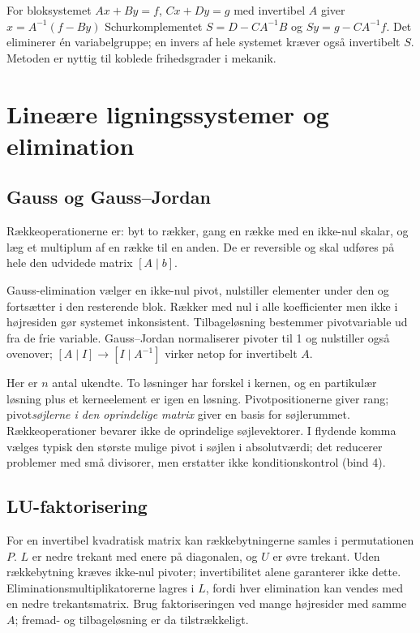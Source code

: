 For bloksystemet $Ax+By=f$, $Cx+Dy=g$ med invertibel $A$ giver
$x=A^{-1}(f-By)$ Schurkomplementet
$S=D-CA^{-1}B$ og $Sy=g-CA^{-1}f$. Det eliminerer én variabelgruppe;
en invers af hele systemet kræver også invertibelt $S$.
Metoden er nyttig til koblede frihedsgrader i mekanik.

\section{Lineære ligningssystemer og elimination}
\subsection{Gauss og Gauss--Jordan}
Rækkeoperationerne er: byt to rækker, gang en række med en ikke-nul
skalar, og læg et multiplum af en række til en anden. De er reversible
og skal udføres på hele den udvidede matrix $[A\mid b]$.

Gauss-elimination vælger en ikke-nul pivot, nulstiller elementer under
den og fortsætter i den resterende blok. Rækker med nul i alle
koefficienter men ikke i højresiden gør systemet inkonsistent.
Tilbageløsning bestemmer pivotvariable ud fra de frie variable.
Gauss--Jordan normaliserer pivoter til 1 og nulstiller også ovenover;
$[A\mid I]\to[I\mid A^{-1}]$ virker netop for invertibelt $A$.

Her er $n$ antal ukendte. To løsninger har forskel i kernen, og en
partikulær løsning plus et kerneelement er igen en løsning.
Pivotpositionerne giver rang; pivot\emph{søjlerne i den oprindelige matrix}
giver en basis for søjlerummet. Rækkeoperationer bevarer ikke de
oprindelige søjlevektorer. I flydende komma vælges typisk den største
mulige pivot i søjlen i absolutværdi; det reducerer problemer med små
divisorer, men erstatter ikke konditionskontrol (bind 4).

\subsection{LU-faktorisering}
For en invertibel kvadratisk matrix kan rækkebytningerne samles i
permutationen $P$. $L$ er nedre trekant med enere på diagonalen, og
$U$ er øvre trekant. Uden rækkebytning kræves ikke-nul pivoter;
invertibilitet alene garanterer ikke dette.
Eliminationsmultiplikatorerne lagres i $L$, fordi hver elimination kan
vendes med en nedre trekantsmatrix. Brug faktoriseringen ved mange
højresider med samme $A$; fremad- og tilbageløsning er da tilstrækkeligt.

